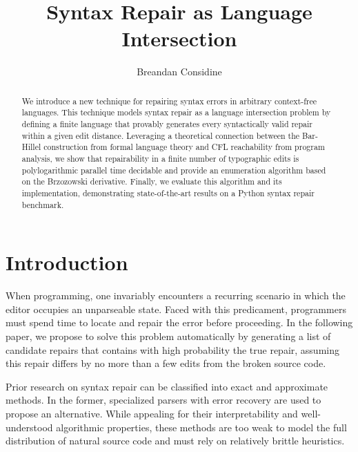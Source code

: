 \documentclass[sigplan,review,acmsmall,nonacm,screen,anonymous]{acmart}\settopmatter{printfolios=false,printccs=false,printacmref=false}
\begin{document}
%
\title{Syntax Repair as Language Intersection}
%
\begin{abstract}
We introduce a new technique for repairing syntax errors in arbitrary context-free languages. This technique models syntax repair as a language intersection problem by defining a finite language that provably generates every syntactically valid repair within a given edit distance. Leveraging a theoretical connection between the Bar-Hillel construction from formal language theory and CFL reachability from program analysis, we show that repairability in a finite number of typographic edits is polylogarithmic parallel time decidable and provide an enumeration algorithm based on the Brzozowski derivative. Finally, we evaluate this algorithm and its implementation, demonstrating state-of-the-art results on a Python syntax repair benchmark.
\end{abstract}

\author{Breandan Considine}

\maketitle

\section{Introduction}\label{sec:intro}

When programming, one invariably encounters a recurring scenario in which the editor occupies an unparseable state. Faced with this predicament, programmers must spend time to locate and repair the error before proceeding. In the following paper, we propose to solve this problem automatically by generating a list of candidate repairs that contains with high probability the true repair, assuming this repair differs by no more than a few edits from the broken source code.

Prior research on syntax repair can be classified into exact and approximate methods. In the former, specialized parsers with error recovery are used to propose an alternative. While appealing for their interpretability and well-understood algorithmic properties, these methods are too weak to model the full distribution of natural source code and must rely on relatively brittle heuristics.
\end{document}
